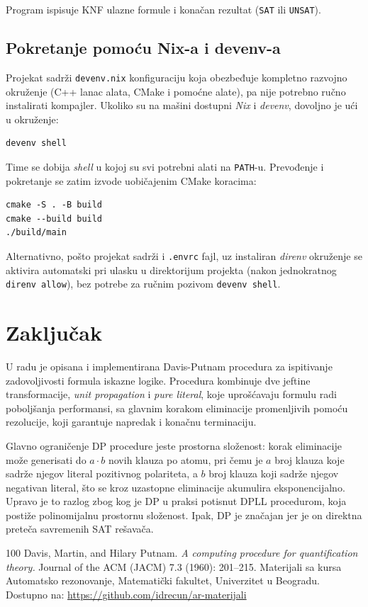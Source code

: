 \documentclass[a4paper,10pt]{article}
\begin{document}
Program ispisuje KNF ulazne formule i konačan rezultat (\verb|SAT| ili \verb|UNSAT|).

\subsection{Pokretanje pomoću Nix-a i devenv-a}\label{subsec:nix}

Projekat sadrži \verb|devenv.nix| konfiguraciju koja obezbeđuje kompletno
razvojno okruženje (C++ lanac alata, CMake i pomoćne alate), pa nije
potrebno ručno instalirati kompajler. Ukoliko su na mašini dostupni
\emph{Nix} i \emph{devenv}, dovoljno je ući u okruženje:

\begin{verbatim}
devenv shell
\end{verbatim}

\noindent Time se dobija \emph{shell} u kojoj su svi potrebni alati na \verb|PATH|-u. Prevođenje i pokretanje se zatim izvode uobičajenim CMake koracima:

\begin{verbatim}
cmake -S . -B build
cmake --build build
./build/main
\end{verbatim}

\noindent Alternativno, pošto projekat sadrži i \verb|.envrc| fajl, uz
instaliran \emph{direnv} okruženje se aktivira automatski pri ulasku u
direktorijum projekta (nakon jednokratnog \verb|direnv allow|), bez
potrebe za ručnim pozivom \verb|devenv shell|.


\section{Zaključak}
\label{sec:zakljucak}
U radu je opisana i implementirana Davis-Putnam procedura za ispitivanje zadovoljivosti formula iskazne logike. Procedura kombinuje dve jeftine transformacije, \emph{unit propagation} i \emph{pure literal}, koje uprošćavaju formulu radi poboljšanja performansi, sa glavnim korakom eliminacije promenljivih pomoću rezolucije, koji garantuje napredak i konačnu terminaciju.

Glavno ograničenje DP procedure jeste prostorna složenost: korak eliminacije može generisati do $a \cdot b$ novih klauza po atomu, pri čemu je $a$ broj klauza koje sadrže njegov literal pozitivnog polariteta, a $b$ broj klauza koji sadrže njegov negativan literal, što se kroz uzastopne eliminacije akumulira eksponencijalno. Upravo je to razlog zbog kog je DP u praksi potisnut DPLL procedurom, koja postiže polinomijalnu prostornu složenost. Ipak, DP je značajan jer je on direktna preteča savremenih SAT rešavača.



\begin{thebibliography}{100}
  Davis, Martin, and Hilary Putnam. \emph{A computing procedure for quantification theory.} Journal of the ACM (JACM) 7.3 (1960): 201--215.
 Materijali sa kursa Automatsko rezonovanje, Matematički fakultet, Univerzitet u Beogradu. Dostupno na: \url{https://github.com/idrecun/ar-materijali}
\end{thebibliography}
\end{document}
